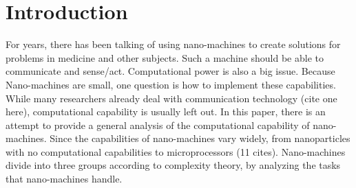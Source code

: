 \documentclass[10pt,sigconf]{acmart}
\begin{document}
\section{Introduction}
For years, there has been talking of using nano-machines to create solutions for problems in medicine and other subjects. Such a machine should be able to communicate and sense/act. Computational power is also a big issue.
Because Nano-machines are small, one question is how to implement these capabilities. 
While many researchers already deal with communication technology (cite one here), computational capability is usually left out.
In this paper, there is an attempt to provide a general analysis of the computational capability of nano-machines.
Since the capabilities of nano-machines vary widely, from nanoparticles with no computational capabilities to microprocessors (11 cites). Nano-machines divide into three groups according to complexity theory,
by analyzing the tasks that nano-machines handle.
\end{document}
